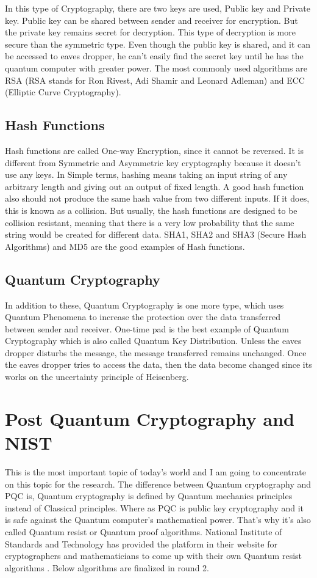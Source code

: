 \documentclass{cpp}
\begin{document}
In this type of Cryptography, there are two keys are used, Public key and Private key. Public key can be shared between sender and receiver for encryption. But the private key remains secret for decryption. This type of decryption is more secure than the symmetric type. Even though the public key is shared, and it can be accessed to eaves dropper, he can’t easily find the secret key until he has the quantum computer with greater power. The most commonly used algorithms are RSA (RSA stands for Ron Rivest, Adi Shamir and Leonard Adleman) and ECC (Elliptic Curve Cryptography).

\subsection{Hash Functions}
Hash functions are called One-way Encryption, since it cannot be reversed. It is different from Symmetric and Asymmetric key cryptography because it doesn’t use any keys. In Simple terms, hashing means taking an input string of any arbitrary length and giving out an output of fixed length. A good hash function also should not produce the same hash value from two different inputs. If it does, this is known as a collision. But usually, the hash functions are designed to be collision resistant, meaning that there is a very low probability that the same string would be created for different data. SHA1, SHA2 and SHA3 (Secure Hash Algorithms) and MD5 are the good examples of Hash functions.

\subsection{Quantum Cryptography}

In addition to these, Quantum Cryptography is one more type, which uses Quantum Phenomena to increase the protection over the data transferred between sender and receiver. One-time pad is the best example of Quantum Cryptography which is also called Quantum Key Distribution. Unless the eaves dropper disturbs the message, the message transferred remains unchanged. Once the eaves dropper tries to access the data, then the data become changed since its works on the uncertainty principle of Heisenberg. 

\section{Post Quantum Cryptography and NIST}
This is the most important topic of today’s world and I am going to concentrate on this topic for the research. The difference between Quantum cryptography and PQC is, Quantum cryptography is defined by Quantum mechanics principles instead of Classical principles. Where as PQC is public key cryptography and it is safe against the Quantum computer’s mathematical power. That’s why it’s also called Quantum resist or Quantum proof algorithms. National Institute of Standards and Technology has provided the platform in their website for cryptographers and mathematicians to come up with their own Quantum resist algorithms \cite{nist}. Below algorithms are finalized in round 2. 
\end{document}
